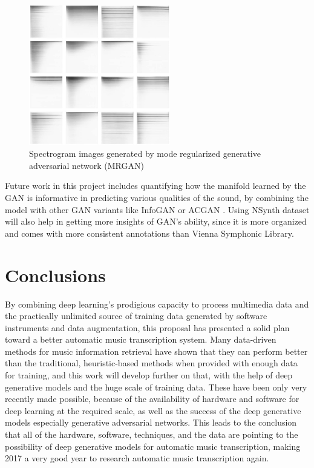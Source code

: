 \begin{figure}
	\centering
	\includegraphics[width=0.55\textwidth]{gan.jpg}
	\caption{Spectrogram images generated by mode regularized generative adversarial network (MRGAN) %
	}\label{fig:gan}
\end{figure}

Future work in this project includes quantifying how the manifold learned by the GAN is informative in predicting various qualities of the sound, by combining the model with other GAN variants like InfoGAN \cite{chen2016infogan} or ACGAN \cite{odena2016acgan}.
Using NSynth dataset will also help in getting more insights of GAN's ability, since it is more organized and comes with more consistent annotations than Vienna Symphonic Library.






\section{Conclusions}\label{sec:conclusions}

By combining deep learning's prodigious capacity to process multimedia data and the practically unlimited source of training data generated by software instruments and data augmentation, this proposal has presented a solid plan toward a better automatic music transcription system.
Many data-driven methods for music information retrieval have shown that they can perform better than the traditional, heuristic-based methods when provided with enough data for training, and this work will develop further on that, with the help of deep generative models and the huge scale of training data.
These have been only very recently made possible, because of the availability of hardware and software for deep learning at the required scale, as well as the success of the deep generative models especially generative adversarial networks.
This leads to the conclusion that all of the hardware, software, techniques, and the data are pointing to the possibility of deep generative models for automatic music transcription, making 2017 a very good year to research automatic music transcription again.

